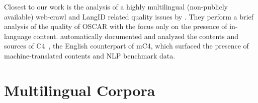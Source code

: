 Closest to our work is the analysis of a highly multilingual (non-publicly available) web-crawl and LangID related quality issues by \citet{caswell-etal-2020-language}.
They perform a brief analysis of the quality of OSCAR
with the focus only on the presence of in-language content.
\citet{dodge-etal-2021-documenting} automatically documented and analyzed the contents and sources of C4~\citep{raffel-etal-2020-exploring}, the English counterpart of mC4, which surfaced the presence of machine-translated contents and NLP benchmark data.

\section{Multilingual Corpora}\label{sec:crawls}

